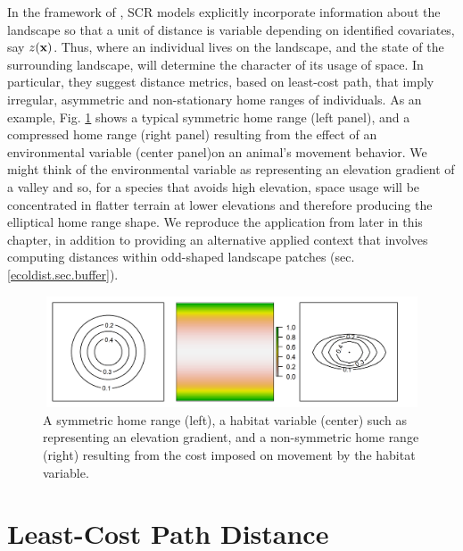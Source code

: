 In the framework of \citet{royle_etal:2012ecol}, SCR models explicitly
incorporate information about the landscape so that a unit of distance
is variable depending on identified covariates, say $z({\bf x})$.
Thus, where an individual lives on the landscape, and the state of the
surrounding landscape, will determine the character of its usage of
space. In particular, they suggest distance metrics, based on
least-cost path, that imply irregular, asymmetric and non-stationary
home ranges of individuals. As an example, Fig. \ref{fig.distort}
shows a typical symmetric home range (left panel), and a compressed
home range (right panel) resulting from the effect of an environmental
variable (center panel)on an animal's movement behavior. We might
think of the environmental variable as representing an elevation
gradient of a valley and so, for a species that avoids high elevation,
space usage will be concentrated in flatter terrain at lower
elevations and therefore producing the elliptical home range shape.
We reproduce the application from \citet{royle_etal:2012ecol} later in
this chapter, in addition to providing an alternative applied context
that involves computing distances within odd-shaped landscape patches
(sec. \ref{ecoldist.sec.buffer}).


\begin{figure}[h]
\centering
\includegraphics[width=5in,height=1.3in]{Ch10-EcolDist/figs/distort}
\caption{A symmetric home range (left), a habitat variable (center)
  such as representing an elevation gradient,
  and a non-symmetric home range (right) resulting from the cost imposed on
  movement by the habitat variable.}
\label{fig.distort}
\end{figure}


\section{Least-Cost Path Distance}

